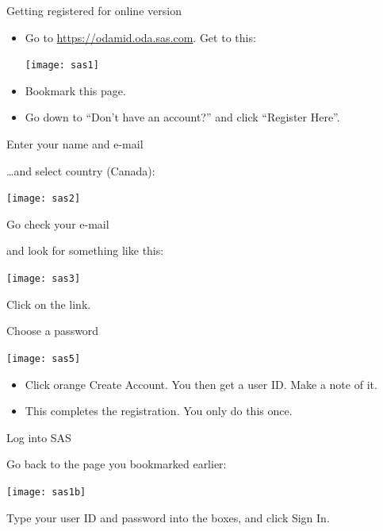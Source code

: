 \documentclass[unknownkeysallowed]{beamer}\usepackage[]{graphicx}\usepackage[]{color}
\begin{document}
\begin{frame}[fragile]{Getting registered for online version}

  \begin{itemize}
  \item Go to \url{https://odamid.oda.sas.com}. Get to this:

\texttt{[image: sas1]}

\item Bookmark this page.
\item Go down to ``Don't have an account?'' and click ``Register Here''.
  \end{itemize}
  
\end{frame}

\begin{frame}[fragile]{Enter your name and e-mail}

\ldots and select country (Canada):

\texttt{[image: sas2]}
  
\end{frame}

\begin{frame}[fragile]{Go check your e-mail}

and look for something like this:

\texttt{[image: sas3]}

Click on the link.
  
\end{frame}

\begin{frame}[fragile]{Choose a password}

\texttt{[image: sas5]}

  \begin{itemize}
  \item Click orange Create Account. You then get a user ID. Make a note of it.
  \item This completes the registration. You only do this once.
  \end{itemize}
  
\end{frame}

\begin{frame}[fragile]{Log into SAS}

Go back to the page you bookmarked earlier:

\texttt{[image: sas1b]}

Type your user ID and password into the boxes, and click Sign In.
  
\end{frame}
\end{document}
